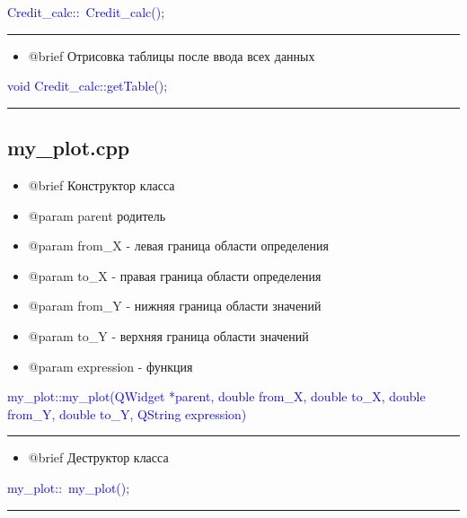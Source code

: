 \documentclass{article}
\begin{document}
\textcolor{blue}{Credit\_calc::~Credit\_calc();}

{\color{red} \rule{\linewidth}{0.5mm}}


\begin{itemize}

\item @brief Отрисовка таблицы после ввода всех данных


\end{itemize}

\textcolor{blue}{void Credit\_calc::getTable();}

{\color{red} \rule{\linewidth}{0.5mm}}


\subsection{\textbf{my\_plot.cpp}}

\begin{itemize}

\item @brief Конструктор класса 
\item @param parent родитель
\item @param from\_X - левая граница области определения
\item @param to\_X - правая граница области определения
\item @param from\_Y - нижняя граница области значений
\item @param to\_Y - верхняя граница области значений
\item @param expression - функция

\end{itemize}


\textcolor{blue}{my\_plot::my\_plot(QWidget *parent, double from\_X, double to\_X, double from\_Y, double to\_Y, QString expression)}

{\color{red} \rule{\linewidth}{0.5mm}}


\begin{itemize}

                 
\item @brief Деструктор класса

\end{itemize}

\textcolor{blue}{my\_plot::~my\_plot();}

{\color{red} \rule{\linewidth}{0.5mm}}
\end{document}
